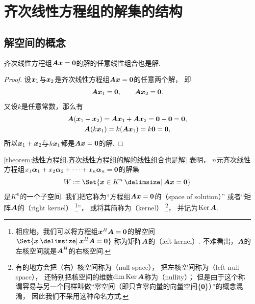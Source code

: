 \section{齐次线性方程组的解集的结构}
\subsection{解空间的概念}
\begin{proposition}\label{theorem:线性方程组.齐次线性方程组的解的线性组合也是解}
齐次线性方程组\(\boldsymbol{A} \boldsymbol{x} = \boldsymbol0\)的解的任意线性组合也是解.
\begin{proof}
设\(\boldsymbol{x}_1\)与\(\boldsymbol{x}_2\)是齐次线性方程组\(\boldsymbol{A} \boldsymbol{x} = \boldsymbol0\)的任意两个解，
即\begin{equation*}
	\boldsymbol{A}\boldsymbol{x}_1=\boldsymbol0, \qquad
	\boldsymbol{A}\boldsymbol{x}_2=\boldsymbol0.
\end{equation*}
又设\(k\)是任意常数，那么有\begin{gather*}
	\boldsymbol{A} (\boldsymbol{x}_1 + \boldsymbol{x}_2) = \boldsymbol{A} \boldsymbol{x}_1 + \boldsymbol{A} \boldsymbol{x}_2 = \boldsymbol0 + \boldsymbol0 = \boldsymbol0, \\
	\boldsymbol{A} (k \boldsymbol{x}_1) = k (\boldsymbol{A} \boldsymbol{x}_1) = k \boldsymbol0 = \boldsymbol0,
\end{gather*}
所以\(\boldsymbol{x}_1 + \boldsymbol{x}_2\)与\(k \boldsymbol{x}_1\)都是\(\boldsymbol{A} \boldsymbol{x} = \boldsymbol0\)的解.
\end{proof}
\end{proposition}

\cref{theorem:线性方程组.齐次线性方程组的解的线性组合也是解} 表明，
\(n\)元齐次线性方程组\(x_1\boldsymbol\alpha_1+x_2\boldsymbol\alpha_2+\dotsb+x_n\boldsymbol\alpha_n=\boldsymbol0\)的解集\begin{equation*}
	W
	\defeq
	\Set{
		\vb{x} \in K^n
		\given
		\vb{A} \vb{x} = \vb0
	}
\end{equation*}是\(K^n\)的一个子空间.
我们把它称为“方程组\(\boldsymbol{A} \boldsymbol{x} = \boldsymbol0\)的（space of solution）”
或者“矩阵\(\boldsymbol{A}\)的（right kernel）
\footnote{
	相应地，我们可以将方程组\(\boldsymbol{x}^H \boldsymbol{A} = \boldsymbol0\)的解空间\(
		\Set{ \vb{x} \given \vb{x}^H \vb{A} = \vb0 }
	\)
	称为矩阵\(\boldsymbol{A}\)的（left kernel）.
	不难看出，\(\boldsymbol{A}\)的左核空间就是\(\boldsymbol{A}^H\)的右核空间.
}”，
或将其简称为（kernel）
\footnote{
	有的地方会把（右）核空间称为（null space），
	把左核空间称为（left null space），
	还特别把核空间的维数\(\dim\operatorname{Ker}\boldsymbol{A}\)称为（nullity）；
	但是由于这个称谓容易与另一个同样叫做“零空间（即只含零向量的向量空间\(\{\boldsymbol0\}\)）”的概念混淆，
	因此我们不采用这种命名方式.
}，
并记为\(\operatorname{Ker}\boldsymbol{A}\).

